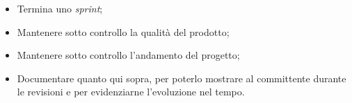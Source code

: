 \label{aggiornare-pdq}

\begin{itemize}
	\item Termina uno \textit{sprint};
\end{itemize}

\begin{itemize}
	\item Mantenere sotto controllo la qualità del prodotto;

	\item Mantenere sotto controllo l'andamento del progetto;

	\item Documentare quanto qui sopra, per poterlo mostrare al committente
	      durante le revisioni e per evidenziarne l'evoluzione nel tempo.
\end{itemize}

